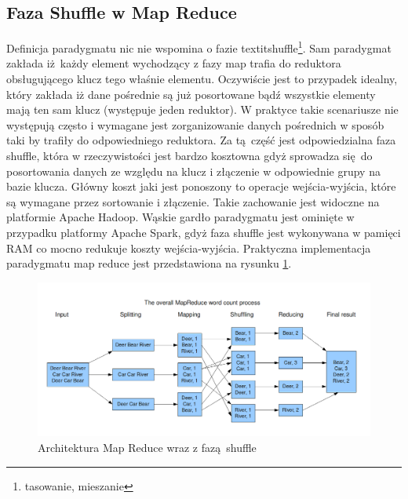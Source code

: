 \subsection{Faza Shuffle w Map Reduce}
Definicja paradygmatu nic nie wspomina o fazie textit{shuffle}\footnote{tasowanie, mieszanie}. Sam paradygmat zakłada iż każdy element wychodzący z fazy map trafia do reduktora obsługującego klucz tego właśnie elementu. Oczywiście jest to przypadek idealny, który zakłada iż dane pośrednie są już posortowane bądź wszystkie elementy mają ten sam klucz (występuje jeden reduktor). W praktyce takie scenariusze nie występują często i wymagane jest zorganizowanie danych pośrednich w sposób taki by trafiły do odpowiedniego reduktora. Za tą część jest odpowiedzialna faza shuffle, która w rzeczywistości jest bardzo kosztowna gdyż sprowadza się do posortowania danych ze względu na klucz i złączenie w odpowiednie grupy na bazie klucza. Główny koszt jaki jest ponoszony to operacje wejścia-wyjścia, które są wymagane przez sortowanie i złączenie. Takie zachowanie jest widoczne na platformie Apache Hadoop.\cite{shuffle_description} Wąskie gardło paradygmatu jest ominięte w przypadku platformy Apache Spark, gdyż faza shuffle jest wykonywana w pamięci RAM co mocno redukuje koszty wejścia-wyjścia.\cite{spark_in_memory}
\newline
Praktyczna implementacja paradygmatu map reduce jest przedstawiona na rysunku \ref{fig:@=map_shuffle_reduce_schema}.\cite{map_shuffle_reduce_figure}
\begin{figure}
	\centering
	\includegraphics[scale=0.3]{MapReduceWordCount.png}
	\caption{Architektura Map Reduce wraz z fazą shuffle}
	\label{fig:@=map_shuffle_reduce_schema}
\end{figure}
